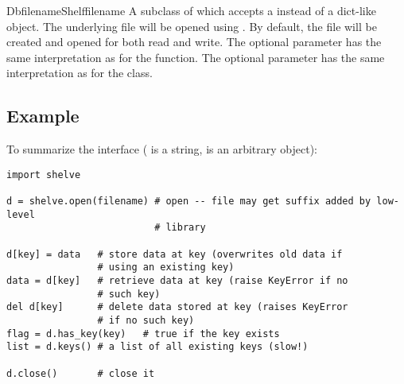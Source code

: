 \begin{classdesc}{DbfilenameShelf}{filename}
A subclass of  which accepts a  instead of a dict-like
object.  The underlying file will be opened using .
By default, the file will be created and opened for both read and write.
The optional  parameter has the same interpretation as for the
 function.
The optional  parameter has the same interpretation as for the
 class.
\end{classdesc}

\subsection{Example}

To summarize the interface ( is a string,  is an
arbitrary object):

\begin{verbatim}
import shelve

d = shelve.open(filename) # open -- file may get suffix added by low-level
                          # library

d[key] = data   # store data at key (overwrites old data if
                # using an existing key)
data = d[key]   # retrieve data at key (raise KeyError if no
                # such key)
del d[key]      # delete data stored at key (raises KeyError
                # if no such key)
flag = d.has_key(key)   # true if the key exists
list = d.keys() # a list of all existing keys (slow!)

d.close()       # close it
\end{verbatim}

\begin{seealso}
\end{seealso}

